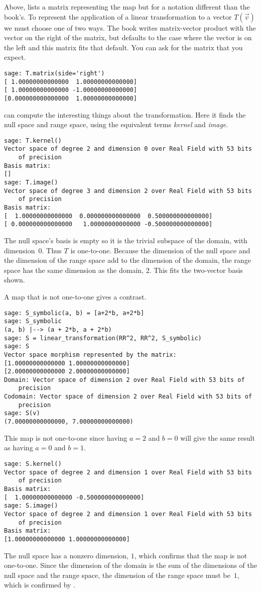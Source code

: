 Above, \Sage{} lists a matrix representing the map but 
for a notation different than the book's.
To represent the application of a 
linear transformation to a vector $T(\vec{v})$ we must choose
one of two ways.
The book writes matrix-vector product with the vector on the right of the 
matrix, but \Sage{} defaults to the case where the vector is on the left
and this matrix fits that default.
You can ask for the matrix that you expect. 
\begin{lstlisting}
sage: T.matrix(side='right')
[ 1.00000000000000  1.00000000000000]
[ 1.00000000000000 -1.00000000000000]
[0.000000000000000  1.00000000000000]  
\end{lstlisting}

\Sage{} can compute the interesting things about the transformation.
Here it finds the null space 
and range space, using the equivalent 
terms \textit{kernel} and \textit{image}.
\begin{lstlisting}
sage: T.kernel()                                       
Vector space of degree 2 and dimension 0 over Real Field with 53 bits 
    of precision
Basis matrix:
[]
sage: T.image()                                        
Vector space of degree 3 and dimension 2 over Real Field with 53 bits 
    of precision
Basis matrix:
[  1.00000000000000  0.000000000000000  0.500000000000000]
[ 0.000000000000000   1.00000000000000 -0.500000000000000]
\end{lstlisting}
The null space's basis is empty so it is the trivial subspace of the domain,
with dimension~$0$.
Thus $T$ is one-to-one.
Because the dimension of the null space and the dimension of the 
range space add to the dimension of the domain,
the range space has the same dimension as the domain, $2$.
This fits the two-vector basis shown.

A map that is not one-to-one gives a contrast.
\begin{lstlisting}
sage: S_symbolic(a, b) = [a+2*b, a+2*b]
sage: S_symbolic
(a, b) |--> (a + 2*b, a + 2*b)
sage: S = linear_transformation(RR^2, RR^2, S_symbolic)
sage: S
Vector space morphism represented by the matrix:
[1.00000000000000 1.00000000000000]
[2.00000000000000 2.00000000000000]
Domain: Vector space of dimension 2 over Real Field with 53 bits of 
    precision
Codomain: Vector space of dimension 2 over Real Field with 53 bits of 
    precision
sage: S(v)
(7.00000000000000, 7.00000000000000)
\end{lstlisting}
This map is not one-to-one since having $a=2$ and $b=0$ will give
the same result as having $a=0$ and $b=1$.  
\begin{lstlisting}
sage: S.kernel()
Vector space of degree 2 and dimension 1 over Real Field with 53 bits 
    of precision
Basis matrix:
[  1.00000000000000 -0.500000000000000]
sage: S.image()
Vector space of degree 2 and dimension 1 over Real Field with 53 bits 
    of precision
Basis matrix:
[1.00000000000000 1.00000000000000]  
\end{lstlisting}
The null space has a nonzero dimension, $1$, which confirms that the map is not
one-to-one.
Since the dimension of the domain is the sum of the dimensions of the null
space and the range space, the dimension of the range space must be~$1$, 
which is confirmed by \Sage{}.


